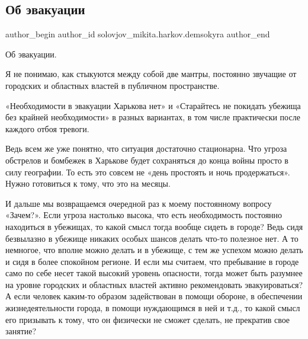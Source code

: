 
 
 
 
 
 
\subsection{Об эвакуации}
\label{sec:21_04_2022.fb.solovjov_mikita.harkov.demsokyra.2.evakuacia}
 
\ifcmt
 author_begin
   author_id solovjov_mikita.harkov.demsokyra
 author_end
\fi

Об эвакуации.

Я не понимаю, как стыкуются между собой две мантры, постоянно звучащие от
городских и областных властей в публичном пространстве. 

«Необходимости в эвакуации Харькова нет» и «Старайтесь не покидать убежища без
крайней необходимости» в разных вариантах, в том числе практически после
каждого отбоя тревоги. 

Ведь всем же уже понятно, что ситуация достаточно стационарна. Что угроза
обстрелов и бомбежек в Харькове будет сохраняться до конца войны просто в силу
географии. То есть это совсем не «день простоять и ночь продержаться». Нужно
готовиться к тому, что это на месяцы. 

И дальше мы возвращаемся очередной раз к моему постоянному вопросу «Зачем?».
Если угроза настолько высока, что есть необходимость постоянно находиться в
убежищах, то какой смысл тогда вообще сидеть в городе? Ведь сидя безвылазно в
убежище никаких особых шансов делать что-то полезное нет. А то немногое, что
вполне можно делать и в убежище, с тем же успехом можно делать и сидя в более
спокойном регионе. И если мы считаем, что пребывание в городе само по себе
несет такой высокий уровень опасности, тогда может быть разумнее на уровне
городских и областных властей активно рекомендовать эвакуироваться? А если
человек каким-то образом задействован в помощи обороне, в обеспечении
жизнедеятельности города, в помощи нуждающимся в ней и т.д., то какой смысл его
призывать к тому, что он физически не сможет сделать, не прекратив свое
занятие? 

